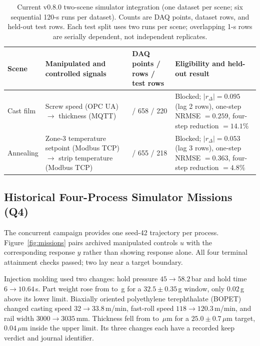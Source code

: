 \begin{table}[!t]
\centering
\caption{Current v0.8.0 two-scene simulator integration (one dataset per
scene; six sequential 120-s runs per dataset). Counts are DAQ points, dataset
rows, and held-out test rows. Each test split uses two runs per scene;
overlapping 1-s rows are serially dependent, not independent replicates.}
\label{tab:q7}
\small
\setlength{\tabcolsep}{4pt}
\begin{tabularx}{\textwidth}{@{}l X >{\centering\arraybackslash}p{2.3cm} X@{}}
\toprule
Scene & Manipulated and controlled signals & DAQ points / rows / test rows & Eligibility and held-out result \\
\midrule
Cast film & Screw speed (OPC UA) $\rightarrow$ thickness (MQTT) & 697 / 658 / 220 & Blocked; $|r_{\Delta}|=0.095$ (lag 2 rows), one-step NRMSE $=0.259$, four-step reduction $=14.1\%$ \\
Annealing & Zone-3 temperature setpoint (Modbus TCP) $\rightarrow$ strip temperature (Modbus TCP) & 696 / 655 / 218 & Blocked; $|r_{\Delta}|=0.053$ (lag 3 rows), one-step NRMSE $=0.363$, four-step reduction $=4.8\%$ \\
\bottomrule
\end{tabularx}
\end{table}

\subsection{Historical Four-Process Simulator Missions (Q4)}
\label{sec:scenarios}
The concurrent campaign provides one seed-42 trajectory per process.
Figure~\ref{fig:missions} pairs archived manipulated controls $u$ with the
corresponding response $y$ rather than showing response alone. All four
terminal attainment checks passed; two lay near a target boundary.

Injection molding used two changes: hold pressure
$45\rightarrow58.2$\,bar and hold time $6\rightarrow10.64$\,s. Part weight
rose from \resInjStart{} to \resInjFinal{}\,g for a
$32.5\pm0.35$\,g window, only $0.02$\,g above its lower limit.
Biaxially oriented polyethylene terephthalate (BOPET) changed casting speed
$32\rightarrow33.8$\,m/min, fast-roll speed
$118\rightarrow120.3$\,m/min, and rail width $3000\rightarrow3035$\,mm.
Thickness fell from \resBiaxStart{} to \resBiaxFinal{}\,$\mu$m for a
$25.0\pm0.7$\,$\mu$m target, $0.04$\,$\mu$m inside the upper limit.
Its three changes each have a recorded keep verdict and journal identifier.


